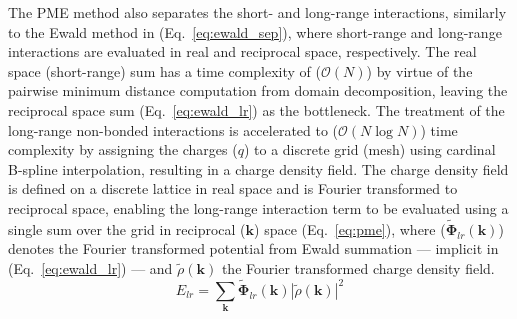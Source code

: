 The PME method also separates the short- and long-range interactions, similarly to the Ewald method in (Eq.~\ref{eq:ewald_sep}), where short-range and long-range interactions are evaluated in real and reciprocal space, respectively. The real space (short-range) sum has a time complexity of ($\mathcal{O}(N)$) by virtue of the pairwise minimum distance computation from domain decomposition, leaving the reciprocal space sum (Eq.~\ref{eq:ewald_lr}) as the bottleneck. The treatment of the long-range non-bonded interactions is accelerated to ($\mathcal{O}(N \log N)$) time complexity by assigning the charges ($q$) to a discrete grid (mesh) using cardinal B-spline interpolation, \cite{Essmann1995} resulting in a charge density field. The charge density field is defined on a discrete lattice in real space and is Fourier transformed to reciprocal space, enabling the long-range interaction term to be evaluated using a single sum over the grid in reciprocal ($\mathbf{k}$) space (Eq.~\ref{eq:pme}), where ($\bm{\tilde{\Phi}}_{lr}(\mathbf{k})$) denotes the Fourier transformed potential from Ewald summation --- implicit in (Eq.~\ref{eq:ewald_lr}) --- and $\tilde{\rho}(\mathbf{k})$ the Fourier transformed charge density field.
%
\begin{equation} \label{eq:pme}
    E_{lr} = \sum_{\mathbf{k}} \bm{\tilde{\Phi}}_{lr}(\mathbf{k}) \left| \tilde{\rho}(\mathbf{k})\right|^2  
\end{equation}
%
%
%
%
%

